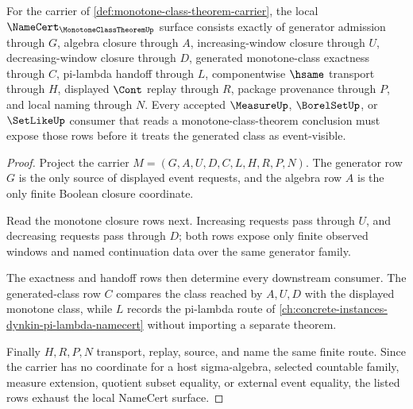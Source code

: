 \begin{theorem}
\label{thm:monotone-class-theorem-namecert-obligations}
For the carrier of \autoref{def:monotone-class-theorem-carrier}, the local $\NameCert_{\MonotoneClassTheoremUp}$ surface consists exactly of generator admission through $G$, algebra closure through $A$, increasing-window closure through $U$, decreasing-window closure through $D$, generated monotone-class exactness through $C$, pi-lambda handoff through $L$, componentwise $\hsame$ transport through $H$, displayed $\Cont$ replay through $R$, package provenance through $P$, and local naming through $N$. Every accepted $\MeasureUp$, $\BorelSetUp$, or $\SetLikeUp$ consumer that reads a monotone-class-theorem conclusion must expose those rows before it treats the generated class as event-visible.
\end{theorem}
\begin{proof}
Project the carrier $M=(G,A,U,D,C,L,H,R,P,N)$. The generator row $G$ is the only source of displayed event requests, and the algebra row $A$ is the only finite Boolean closure coordinate.

Read the monotone closure rows next. Increasing requests pass through $U$, and decreasing requests pass through $D$; both rows expose only finite observed windows and named continuation data over the same generator family.

The exactness and handoff rows then determine every downstream consumer. The generated-class row $C$ compares the class reached by $A,U,D$ with the displayed monotone class, while $L$ records the pi-lambda route of \autoref{ch:concrete-instances-dynkin-pi-lambda-namecert} without importing a separate theorem.

Finally $H,R,P,N$ transport, replay, source, and name the same finite route. Since the carrier has no coordinate for a host sigma-algebra, selected countable family, measure extension, quotient subset equality, or external event equality, the listed rows exhaust the local NameCert surface.
\end{proof}

